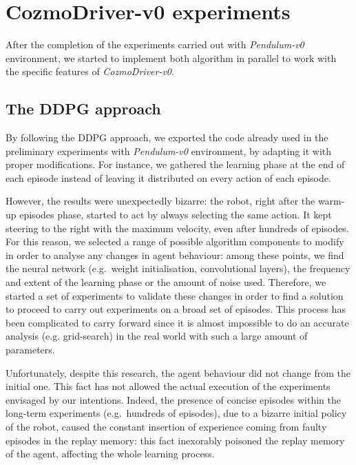 \FloatBarrier

\section{CozmoDriver-v0 experiments} \label{sec:cozmo-exp}

After the completion of the experiments carried out with \textit{Pendulum-v0} environment, we started to implement both algorithm in parallel to work with the specific features of \textit{CozmoDriver-v0}.

\subsection{The DDPG approach}

By following the DDPG approach, we exported the code already used in the preliminary experiments with \textit{Pendulum-v0} environment, by adapting it with proper modifications.
For instance, we gathered the learning phase at the end of each episode instead of leaving it distributed on every action of each episode.

However, the results were unexpectedly bizarre: the robot, right after the warm-up episodes phase, started to act by always selecting the same action. It kept steering to the right with the maximum velocity, even after hundreds of episodes.
For this reason, we selected a range of possible algorithm components to modify in order to analyse any changes in agent behaviour: among these points, we find the neural network (e.g.\ weight initialisation, convolutional layers), the frequency and extent of the learning phase or the amount of noise used.
Therefore, we started a set of experiments to validate these changes in order to find a solution to proceed to carry out experiments on a broad set of episodes.
This process has been complicated to carry forward since it is almost impossible to do an accurate analysis (e.g. grid-search) in the real world with such a large amount of parameters.

Unfortunately, despite this research, the agent behaviour did not change from the initial one.
This fact has not allowed the actual execution of the experiments envisaged by our intentions.
Indeed, the presence of concise episodes within the long-term experiments (e.g.\ hundreds of episodes), due to a bizarre initial policy of the robot, caused the constant insertion of experience coming from faulty episodes in the replay memory: this fact inexorably poisoned the replay memory of the agent, affecting the whole learning process.

